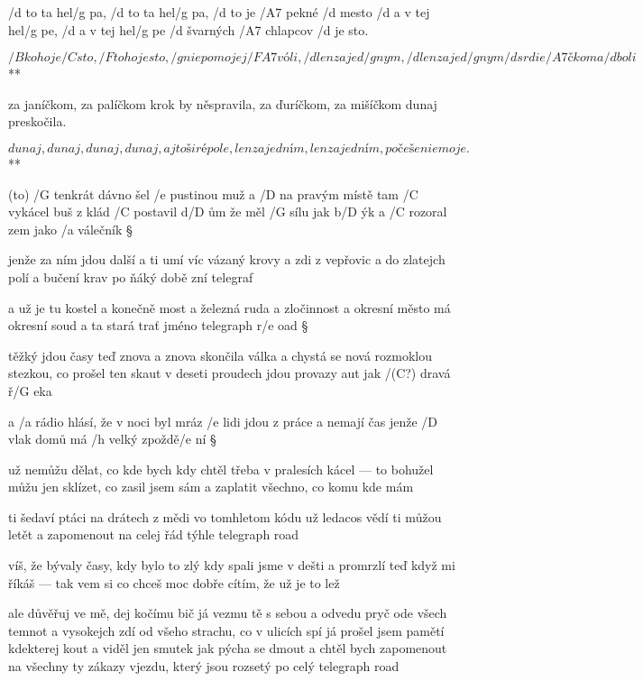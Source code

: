 
/d to ta hel/g pa, /d to ta hel/g pa, /d to je /A7 pekné /d mesto
/d a v tej hel/g pe, /d a v tej hel/g pe /d švarných /A7 chlapcov /d je sto.

\R  \[ /B koho je /C sto, /F toho je sto, /g nie po mojej /{F A7} vóli,
    /d len za jed/g nym, /d len za jed/g nym /d srdie/A7 čko ma /d boli \] **

za janíčkom, za palíčkom krok by něspravila,
za ďuríčkom, za mišíčkom dunaj preskočila.

\R  \[ dunaj, dunaj, dunaj, dunaj, aj to širé pole,
    len za jedním, len za jedním, počešenie moje. \] **




(to) /G tenkrát dávno šel /e pustinou muž
a /D na pravým místě tam /C vykácel buš
z klád /C postavil d/D ům že měl /G sílu jak b/D ýk
a /C rozoral zem jako /a válečník \S

jenže za ním jdou další a ti umí víc
vázaný krovy a zdi z vepřovic
a do zlatejch polí a bučení krav
po ňáký době zní telegraf \s

a už je tu kostel a konečně most
a železná ruda a zločinnost
a okresní město má okresní soud
a ta stará trať jméno telegraph r/e oad \S

těžký jdou časy teď znova a znova
skončila válka a chystá se nová
rozmoklou stezkou, co prošel ten skaut
v deseti proudech jdou provazy aut
jak /(C?) dravá ř/G eka \s

a /a rádio hlásí, že v noci byl mráz
/e lidi jdou z práce a nemají čas
jenže /D vlak domů má /h velký zpoždě/e ní \S

už nemůžu dělat, co kde bych kdy chtěl
třeba v pralesích kácel --- to bohužel
můžu jen sklízet, co zasil jsem sám
a zaplatit všechno, co komu kde mám \s

ti šedaví ptáci na drátech z mědi
vo tomhletom kódu už ledacos vědí
ti můžou letět a zapomenout
na celej řád týhle telegraph road \songgg

víš, že bývaly časy, kdy bylo to zlý
kdy spali jsme v dešti a promrzlí
teď když mi říkáš --- tak vem si co chceš
moc dobře cítím, že už je to lež \s

ale důvěřuj ve mě, dej kočímu bič
já vezmu tě s sebou a odvedu pryč
ode všech temnot a vysokejch zdí
od všeho strachu, co v ulicích spí
já prošel jsem pamětí kdekterej kout
a viděl jen smutek jak pýcha se dmout
a chtěl bych zapomenout
na všechny ty zákazy vjezdu, který jsou rozsetý
po celý telegraph road



